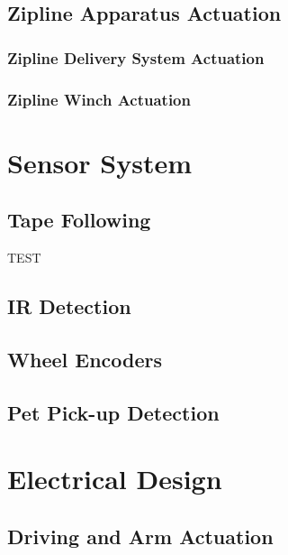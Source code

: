 \documentclass[11pt, oneside]{article} %
\begin{document}
	\subsection{Zipline Apparatus Actuation}
	
		\subsubsection{Zipline Delivery System Actuation}
		
		\subsubsection{Zipline Winch Actuation}



\section{Sensor System}
	
	\subsection{Tape Following}
	
	TEST
	
	\subsection{IR Detection}
	
	\subsection{Wheel Encoders}
	
	\subsection{Pet Pick-up Detection}
	

\section{Electrical Design}

	\subsection{Driving and Arm Actuation}
	
\end{document}
